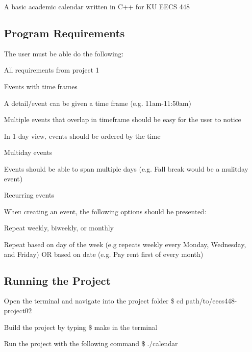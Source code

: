A basic academic calendar written in C++ for KU E\+E\+CS 448

\subsection*{Program Requirements}

The user must be able do the following\+:
\begin{DoxyItemize}
\item All requirements from project 1
\item Events with time frames
\begin{DoxyItemize}
\item A detail/event can be given a time frame (e.\+g. 11am-\/11\+:50am)
\item Multiple events that overlap in timeframe should be easy for the user to notice
\item In 1-\/day view, events should be ordered by the time
\end{DoxyItemize}
\item Multiday events
\begin{DoxyItemize}
\item Events should be able to span multiple days (e.\+g. Fall break would be a mulitday event)
\end{DoxyItemize}
\item Recurring events
\begin{DoxyItemize}
\item When creating an event, the following options should be presented\+:
\begin{DoxyItemize}
\item Repeat weekly, biweekly, or monthly
\item Repeat based on day of the week (e.\+g repeats weekly every Monday, Wednesday, and Friday) OR based on date (e.\+g. Pay rent first of every month)
\end{DoxyItemize}
\end{DoxyItemize}
\end{DoxyItemize}

\subsection*{Running the Project}


\begin{DoxyItemize}
\item Open the terminal and navigate into the project folder {\ttfamily \$ cd path/to/eecs448-\/project02}
\item Build the project by typing {\ttfamily \$ make} in the terminal
\item Run the project with the following command {\ttfamily \$ ./calendar}
\end{DoxyItemize}

